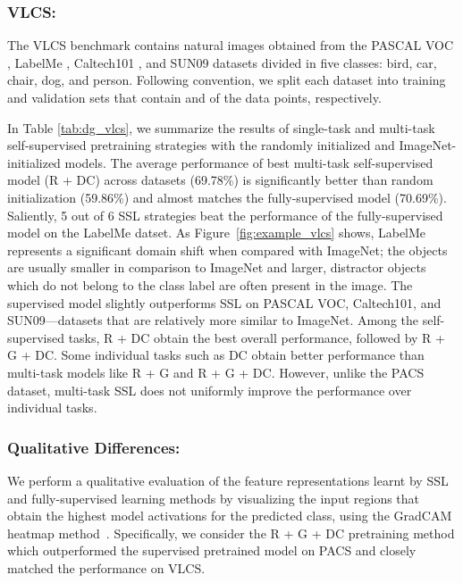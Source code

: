 \documentclass[runningheads]{llncs}
\begin{document}
\vspace{-5pt}\subsubsection{VLCS:} The VLCS benchmark \cite{fang2013unbiased} contains natural images obtained from the PASCAL VOC \cite{everingham2010pascal}, LabelMe \cite{russell2008labelme}, Caltech101 \cite{fei2004learning}, and SUN09 \cite{choi2010exploiting} datasets divided in five classes: bird, car, chair, dog, and person. Following convention, we split each dataset into training and validation sets that contain  and  of the data points, respectively. 

In Table \ref{tab:dg_vlcs}, we summarize the results of  single-task and multi-task self-supervised pretraining strategies with the randomly initialized and ImageNet-initialized models. The average performance of best multi-task self-supervised model (R + DC) across datasets (69.78\%) is significantly better than random initialization (59.86\%) and almost matches the fully-supervised model (70.69\%). Saliently, 5 out of 6 SSL strategies beat the performance of the fully-supervised model on the LabelMe datset. As Figure~\ref{fig:example_vlcs} shows, LabelMe represents a significant domain shift when compared with ImageNet; the objects are usually smaller in comparison to ImageNet and larger, distractor objects which do not belong to the class label are often  present in the image. The supervised model slightly outperforms SSL on PASCAL VOC,  Caltech101, and SUN09---datasets that are relatively more similar to ImageNet.
Among the self-supervised tasks, R + DC obtain the best overall performance, followed by R + G + DC. Some individual tasks such as DC obtain better performance than multi-task models like R + G and R + G + DC. However, unlike the PACS dataset, multi-task SSL does not uniformly improve the performance over individual tasks. 


\vspace{-5pt}\subsubsection{Qualitative Differences:} 
We perform a qualitative evaluation of the feature representations learnt by SSL and fully-supervised learning methods by visualizing the input regions that obtain the highest model activations for the predicted class, using the GradCAM heatmap method~\cite{selvaraju2017grad}. Specifically, we consider the R + G + DC pretraining method which outperformed the supervised pretrained model on PACS and closely matched the performance on VLCS. 
\end{document}
